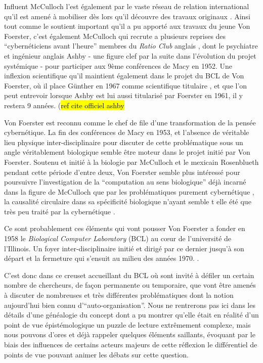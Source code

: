 Influent McCulloch l'est également par le vaste réseau de relation international qu'il est amené à mobiliser dès lors qu'il découvre des travaux originaux \autocites{Dupuy2005, Husbands2012, Levy1985}. Ainsi tout comme le soutient important qu'il a pu apporté aux travaux du jeune Von Foerster, c'est également McCulloch qui recrute a plusieurs reprises des \enquote{cybernéticiens avant l'heure} membres du \textit{Ratio Club} anglais , dont le psychiatre et ingénieur anglais Ashby - une figure clef par la suite dans l'évolution du projet systémique - pour participer aux 9ème conférences de Macy en 1952. Une inflexion scientifique qu'il maintient également dans le projet du BCL de Von Foerster, où il place Günther en 1967 comme scientifique titulaire , et que l'on peut entrevoir lorsque Ashby est lui aussi titularisé par Foerster en 1961, il y restera 9 années. (\hl{ref cite officiel ashby}

Von Foerster est reconnu comme le chef de file d'une transformation de la pensée cybernétique. La fin des conférences de Macy en 1953, et l'absence de véritable lieu physique inter-disciplinaire pour discuter de cette problématique sous un angle véritablement biologique semble être moteur dans le projet initié par Von Foerster. Soutenu et initié à la biologie par McCulloch et le mexicain Rosenblueth pendant cette période d'entre deux, Von Foerster semble plus intéressé pour poursuivre l'investigation de la \enquote{computation au sens biologique} déjà incarné dans la figure de McCulloch que par les problématiques purement cybernétique , la causalité circulaire dans sa spécificité biologique n'ayant semble t elle été que très peu traité par la cybernétique .

Ce sont probablement ces éléments qui vont pousser Von Foerster a fonder en 1958 le \textit{Biological Computer Laboratory} (BCL) au cœur de l'université de l'Illinois. Un foyer inter-disciplinaire initié et dirigé par ce dernier jusqu'à son départ et la fermeture qui s'ensuit au milieu des années 1970. \autocite{Proulx2003}.

C'est donc dans ce creuset accueillant du BCL où sont invité à défiler un certain nombre de chercheurs, de façon permanente ou temporaire, que vont être amenés à discuter de nombreuses et très différentes problématiques dont la notion aujourd'hui bien connu d'\enquote{auto-organisation}. Nous ne rentrerons pas ici dans les détails d'une généalogie du concept dont \textcite{Stengers1985}  a pu montrer qu'elle était en réalité d'un point de vue épistémologique un puzzle de lecture extrêmement complexe, mais nous pouvons d'ores et déjà rappeler quelques éléments saillants, évoquant par le biais des influences de certains acteurs majeurs de cette réflexion le différentiel de points de vue pouvant animer les débats sur cette question.

